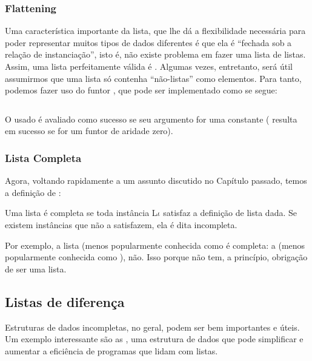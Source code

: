 \documentclass{article}
\begin{document}
\subsubsection{Flattening}

Uma característica importante da lista, que lhe dá a flexibilidade necessária para poder representar muitos tipos de dados diferentes
é que ela é ``fechada sob a relação de instanciação'', isto é, não existe problema em fazer uma lista de listas. Assim, uma lista
perfeitamente válida é \codigo{[[[a,b],c],[]]}. Algumas vezes, entretanto, será útil assumirmos que
uma lista  só contenha ``não-listas'' como elementos. Para tanto, podemos fazer uso do funtor
, que pode ser implementado como se segue:

\inputminted{prolog}{../Exemplos/Cap3/prog3_flatten.pl}\label{lst:flatten}

\noindent O  usado é avaliado como sucesso se seu argumento for uma constante ( resulta em sucesso
se  for um funtor de aridade zero).


\subsubsection{Lista Completa}

Agora, voltando rapidamente a um assunto discutido no Capítulo passado, temos a definição de :

\begin{definition} Uma lista  é completa se toda instância L$\iota$ satisfaz a definição de lista dada. Se existem instâncias que não a satisfazem, ela é dita incompleta.
\end{definition}

Por exemplo, a lista \codigo{[a,b,c]} (menos popularmente conhecida como   é completa: a \codigo{[a,b|Xs]} (menos popularmente conhecida como  ), não. Isso porque  não tem, a princípio, obrigação de ser uma lista.



\subsection{Listas de diferença}

Estruturas de dados incompletas, no geral, podem ser bem importantes e úteis. Um exemplo interessante são as , uma estrutura de dados que pode simplificar e aumentar a eficiência de programas que lidam com listas.
\end{document}
